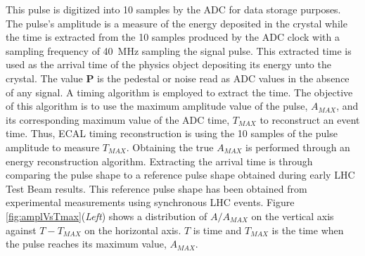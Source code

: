 This pulse is digitized into 10 samples by the ADC for data storage purposes. The pulse's amplitude  is a measure of the energy deposited in the crystal while the time is extracted from the 10 samples produced by the ADC clock with a sampling frequency of 40~MHz sampling the signal pulse. This extracted time is used as the arrival time of the physics object depositing its energy unto the crystal. The value \textbf{P} is the pedestal or noise read as ADC values in the absence of any signal. A timing algorithm is employed to extract the time. The objective of this algorithm is to use the maximum amplitude value of the pulse, $A_{MAX}$, and its corresponding maximum value of the ADC time, $T_{MAX}$ to reconstruct an event time. Thus, ECAL timing reconstruction is using the 10 samples of the pulse amplitude to measure $T_{MAX}$. Obtaining the true $A_{MAX}$ is performed through an energy reconstruction algorithm. Extracting the arrival time is through comparing the pulse shape to a reference pulse shape obtained during early LHC Test Beam results.
This reference pulse shape has been obtained from experimental measurements using synchronous LHC events. Figure \ref{fig:amplVsTmax}(\textit{Left}) shows a distribution of $A/A_{MAX}$ on the vertical axis against $T - T_{MAX}$ on the horizontal axis. $T$ is time and $T_{MAX}$ is the time when the  pulse reaches its maximum value, $A_{MAX}$.

